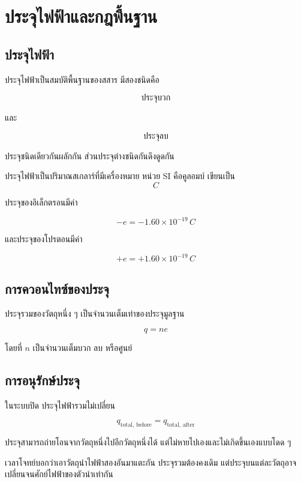 \newpage{}

\section{ประจุไฟฟ้าและกฎพื้นฐาน}

\subsection{ประจุไฟฟ้า}

ประจุไฟฟ้าเป็นสมบัติพื้นฐานของสสาร มีสองชนิดคือ

\[
\text{ประจุบวก}
\]

และ

\[
\text{ประจุลบ}
\]

ประจุชนิดเดียวกันผลักกัน ส่วนประจุต่างชนิดกันดึงดูดกัน

\begin{tcolorbox}[title=นิยาม]
ประจุไฟฟ้าเป็นปริมาณสเกลาร์ที่มีเครื่องหมาย หน่วย SI คือคูลอมบ์ เขียนเป็น
\[
\si{C}
\]
\end{tcolorbox}

ประจุของอิเล็กตรอนมีค่า

\[
-e=-1.60\times10^{-19}\,\si{C}
\]

และประจุของโปรตอนมีค่า

\[
+e=+1.60\times10^{-19}\,\si{C}
\]

\subsection{การควอนไทซ์ของประจุ}

ประจุรวมของวัตถุหนึ่ง ๆ เป็นจำนวนเต็มเท่าของประจุมูลฐาน

\[
q=ne
\]

โดยที่ $n$ เป็นจำนวนเต็มบวก ลบ หรือศูนย์

\subsection{การอนุรักษ์ประจุ}

ในระบบปิด ประจุไฟฟ้ารวมไม่เปลี่ยน

\[
q_{\text{total, before}}=q_{\text{total, after}}
\]

ประจุสามารถถ่ายโอนจากวัตถุหนึ่งไปอีกวัตถุหนึ่งได้ แต่ไม่หายไปเองและไม่เกิดขึ้นเองแบบโดด ๆ

\begin{tcolorbox}[title=ข้อควรจำ]
เวลาโจทย์บอกว่าเอาวัตถุนำไฟฟ้าสองอันมาแตะกัน ประจุรวมต้องคงเดิม แต่ประจุบนแต่ละวัตถุอาจเปลี่ยนจนศักย์ไฟฟ้าของตัวนำเท่ากัน
\end{tcolorbox}

